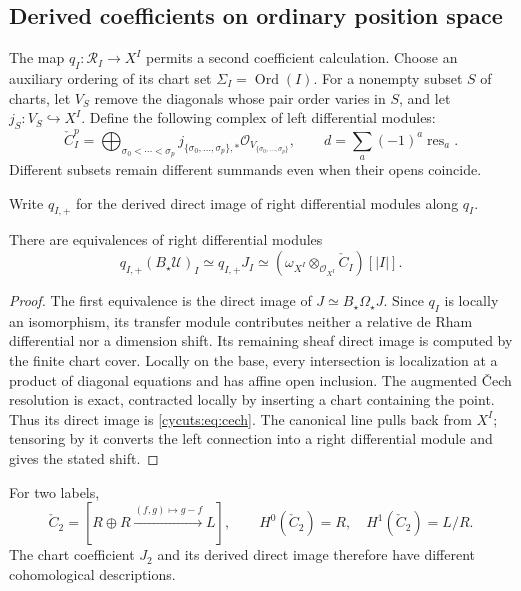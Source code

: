 \subsection{Derived coefficients on ordinary position space}

The map $q_I:\mathscr R_I\to X^I$ permits a second coefficient
calculation. Choose an auxiliary ordering of its chart set
$\Sigma_I=\operatorname{Ord}(I)$. For a nonempty subset $S$ of
charts, let $V_S$ remove the diagonals whose pair order varies in
$S$, and let $j_S:V_S\hookrightarrow X^I$. Define the following
complex of left differential modules:
\begin{equation}\label{cycuts:eq:cech}
 \check C_I^p=\bigoplus_{\sigma_0<\cdots<\sigma_p}
       j_{\{\sigma_0,\ldots,\sigma_p\},*}
                   \mathcal O_{V_{\{\sigma_0,\ldots,\sigma_p\}}},
 \qquad d=\sum_a(-1)^a\operatorname{res}_a.
\end{equation}
Different subsets remain different summands even when their opens
coincide.

Write $q_{I,+}$ for the derived direct image of right differential
modules along $q_I$.

\begin{proposition}\label{cycuts:prop:derived-image}
There are equivalences of right differential modules
\[
 q_{I,+}(B_\star\mathscr U)_I\simeq q_{I,+}J_I
 \simeq(\omega_{X^I}\otimes_{\mathcal O_{X^I}}\check C_I)[|I|].
\]
\end{proposition}
\begin{proof}
The first equivalence is the direct image of $J\simeq B_\star\Omega_\star J$.
Since $q_I$ is locally an isomorphism, its transfer module contributes
neither a relative de Rham differential nor a dimension shift. Its
remaining sheaf direct image is computed by the finite chart cover.
Locally on the base, every intersection is localization at a product
of diagonal equations and has affine open inclusion. The augmented
\v Cech resolution is exact, contracted locally by inserting a chart
containing the point. Thus its direct image is
\eqref{cycuts:eq:cech}. The canonical line pulls back from $X^I$;
tensoring by it converts the left connection into a right differential
module and gives the stated shift.
\end{proof}

For two labels,
\[
 \check C_2=[R\oplus R\xrightarrow{(f,g)\mapsto g-f}L],
 \qquad H^0(\check C_2)=R,\quad H^1(\check C_2)=L/R.
\]
The chart coefficient $J_2$ and its derived direct image therefore
have different cohomological descriptions.

